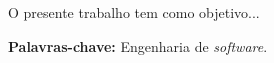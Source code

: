 \begin{resumo}

    O presente trabalho tem como objetivo...


    \textbf{Palavras-chave:} Engenharia de \emph{software}.
\end{resumo}
